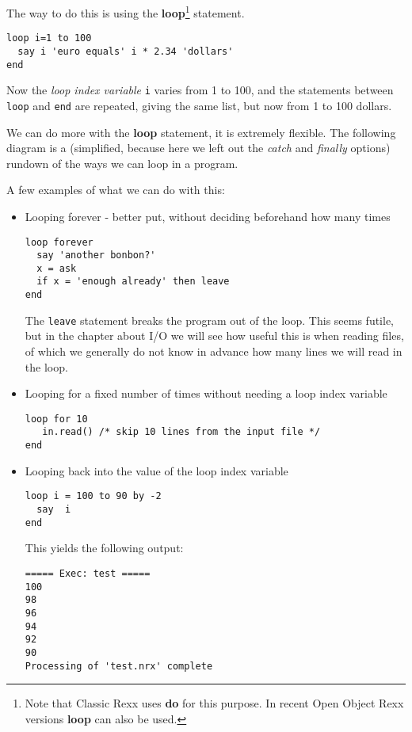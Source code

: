 {The way to do this is using the \textbf{loop}\footnote{Note that
  Classic Rexx uses \textbf{do} for this purpose. In recent Open
  Object Rexx versions
  \textbf{loop} can also be used.} statement.
\begin{lstlisting}[label=withoop,caption=With a loop]
loop i=1 to 100
  say i 'euro equals' i * 2.34 'dollars'
end
\end{lstlisting}
Now the \emph{loop index variable} \texttt{i} varies from 1 to 100,
and the statements between \texttt{loop} and \texttt{end} are
repeated, giving the same list, but now from 1 to 100 dollars.

We can do more with the \textbf{loop} statement, it is extremely
flexible. The following diagram is a (simplified, because here we left
out the \emph{catch} and \emph{finally} options) rundown of the ways
we can loop in a program.


A few examples of what we can do with this: 
\begin{itemize}
\item Looping forever - better put, without deciding beforehand how
  many times
\begin{lstlisting}[label=loopforever,caption=Loop Forever]
loop forever
  say 'another bonbon?'
  x = ask
  if x = 'enough already' then leave
end
\end{lstlisting}
The \texttt{leave} statement breaks the program out of the loop. This
seems futile, but in the chapter about I/O we will see how useful this
is when reading files, of which we generally do not know in advance
how many lines we will read in the loop.

\item Looping for a fixed number of times without needing a loop index
  variable
\begin{lstlisting}[label=loopfixed,caption=Loop for a fixed number of
  times without loop index variable]
loop for 10
   in.read() /* skip 10 lines from the input file */
end
\end{lstlisting}
\item Looping back into the value of the loop index variable
\begin{lstlisting}[label=loopforever,caption=Loop Forever]
loop i = 100 to 90 by -2
  say  i
end
\end{lstlisting}
This yields the following output:
\begin{verbatim}
===== Exec: test =====
100
98
96
94
92
90
Processing of 'test.nrx' complete
\end{verbatim}
\end{itemize}

}
